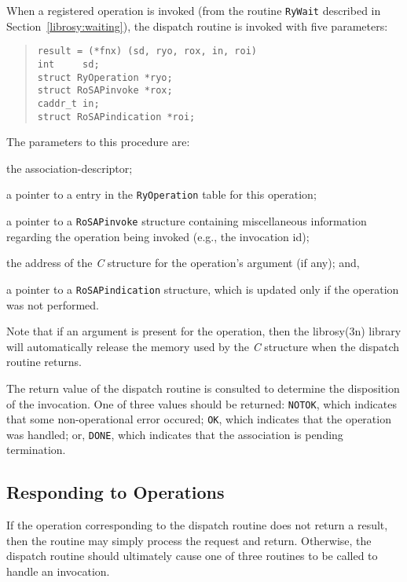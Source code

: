When a registered operation is invoked
(from the routine \verb"RyWait" described in Section~\ref{librosy:waiting}),
the dispatch routine is invoked with five parameters:
\begin{quote}\small\begin{verbatim}
result = (*fnx) (sd, ryo, rox, in, roi)
int     sd;
struct RyOperation *ryo;
struct RoSAPinvoke *rox;
caddr_t in;
struct RoSAPindication *roi;
\end{verbatim}\end{quote}
The parameters to this procedure are:
\begin{describe}
\item[\verb"sd":] the association-descriptor;

\item[\verb"ryo":] a pointer to a entry in the \verb"RyOperation" table
for this operation;

\item[\verb"rox":] a pointer to a \verb"RoSAPinvoke" structure containing
miscellaneous information regarding the operation being invoked
(e.g., the invocation id);

\item[\verb"in":] the address of the {\em C\/} structure for the operation's
argument (if any);
and,

\item[\verb"roi":] a pointer to a \verb"RoSAPindication" structure,
which is updated only if the operation was not performed.
\end{describe}
Note that if an argument is present for the operation,
then the \man librosy(3n) library will automatically release the memory used
by the {\em C\/} structure when the dispatch routine returns.

The return value of the dispatch routine is consulted to determine the
disposition of the invocation.
One of three values should be returned:
\verb"NOTOK", which indicates that some non-operational error occured;
\verb"OK", which indicates that the operation was handled;
or,
\verb"DONE", which indicates that the association is pending termination.

\subsection	{Responding to Operations}
If the operation corresponding to the dispatch routine does not return a
result,
then the routine may simply process the request and return.
Otherwise,
the dispatch routine should ultimately cause one of three routines to be
called to handle an invocation.

